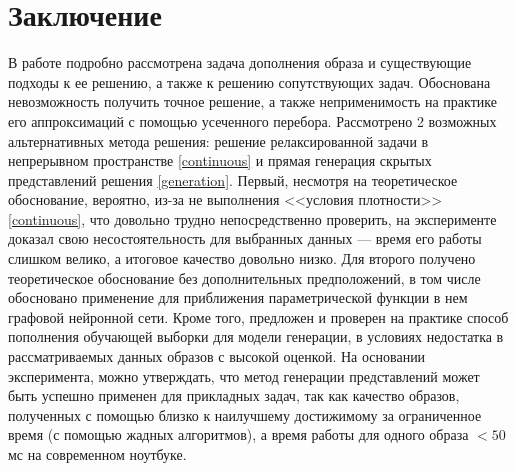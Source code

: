 \documentclass[a4paper,14pt]{extarticle}
\begin{document}
			\section{Заключение}
				В работе подробно рассмотрена задача дополнения образа и существующие подходы к ее решению, а также к решению сопутствующих задач. Обоснована невозможность получить точное решение, а также неприменимость на практике его аппроксимаций с помощью усеченного перебора. Рассмотрено 2 возможных альтернативных метода решения:  решение релаксированной задачи в непрерывном пространстве \ref{continuous} и прямая генерация скрытых представлений решения \ref{generation}. Первый, несмотря на теоретическое обоснование, вероятно, из-за не выполнения <<условия плотности>> \ref{continuous}, что довольно трудно непосредственно проверить, на эксперименте доказал свою несостоятельность для выбранных данных --- время его работы слишком велико, а итоговое качество довольно низко. Для второго получено теоретическое обоснование без дополнительных предположений, в том числе обосновано применение для приближения параметрической функции в нем графовой нейронной сети. Кроме того, предложен и проверен на практике способ пополнения обучающей выборки для модели генерации, в условиях недостатка в рассматриваемых данных образов с высокой оценкой. 
				На основании эксперимента, можно утверждать, что метод генерации представлений может быть успешно применен для прикладных задач, так как качество образов, полученных с помощью близко к наилучшему достижимому за ограниченное время (с помощью жадных алгоритмов), а время работы для одного образа $<50$мс на современном ноутбуке.
				
			
	
	
			
	 
\end{document}
